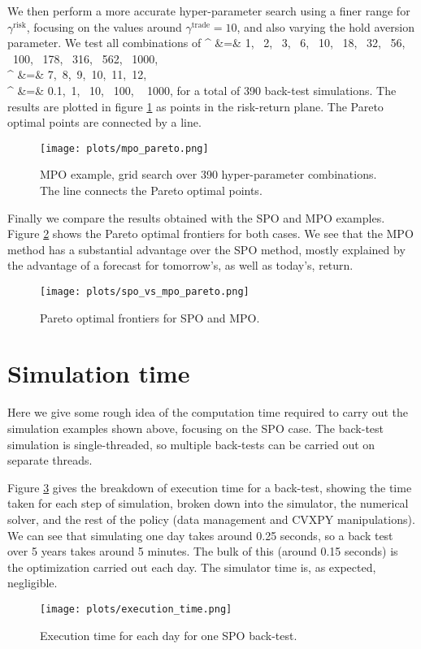 \documentclass[openany]{article}  %
\begin{document}
We then perform a more accurate hyper-parameter search
using a finer range for $\gamma^\text{risk}$,
focusing on the values around $\gamma^\text{trade}=10$,
and also varying the hold aversion parameter.
We test all combinations of
\BEAS
\gamma^ &=& 1, ~2, ~3, ~6, ~10, ~18, ~32, ~56, ~100, ~178, ~316, ~562, ~1000,\\
\gamma^ &=& 7,~8,~9,~10,~11,~12,\\
\gamma^ &=& 0.1,~1, ~10,~ 100, ~ 1000,
\EEAS
for a total of 390 back-test simulations.
The results are plotted in
figure \ref{fig:mpo-pareto} as points in the risk-return plane.
The Pareto optimal points are connected by a line.
\begin{figure}
\begin{center}
\texttt{[image: plots/mpo\_pareto.png]}
\end{center}
\caption{MPO example, grid search over 390 hyper-parameter combinations.
The line connects the Pareto optimal points.}
\label{fig:mpo-pareto}
\end{figure}

Finally we compare the results obtained with the SPO and MPO
examples. Figure \ref{fig:spo-mpo-pareto}
shows the Pareto optimal frontiers for both cases.
We see that the MPO method has a substantial advantage over the SPO method,
mostly explained by the advantage of a forecast for tomorrow's, as well as
today's, return.
\begin{figure}
\begin{center}
\texttt{[image: plots/spo\_vs\_mpo\_pareto.png]}
\end{center}
\caption{Pareto optimal frontiers for SPO and MPO.}
\label{fig:spo-mpo-pareto}
\end{figure}

\section{Simulation time}
Here we give some rough idea of the computation time required to
carry out the simulation examples shown above, focusing on the
SPO case.
The back-test simulation is single-threaded, so multiple back-tests
can be carried out on separate threads.

Figure \ref{fig:execution-time} gives the breakdown of execution time
for a back-test, showing the time taken for each step of simulation,
broken down into
the simulator, the numerical solver, and the rest of the
policy (data management and CVXPY manipulations).
We can see that simulating one day takes around 0.25 seconds,
so a back test over 5 years
takes around 5 minutes.
The bulk of this (around 0.15 seconds) is the optimization carried out each day.
The simulator time is, as expected, negligible.
\begin{figure}
\begin{center}
\texttt{[image: plots/execution\_time.png]}
\end{center}
\caption{Execution time for each day for one SPO back-test.}
\label{fig:execution-time}
\end{figure}
\end{document}
